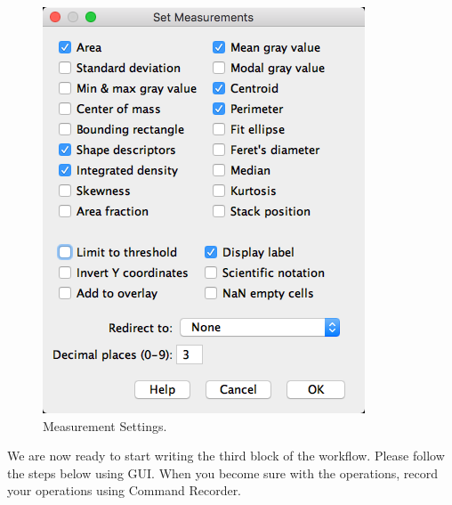 \begin{figure}[h!]
\begin{center}
\includegraphics[scale=0.5]{fig/SetMeasurements.png}
\caption{Measurement Settings.}
\label{fig:MeasSetting}
\end{center}
\end{figure}

We are now ready to start writing the third block of the workflow. Please follow the steps below using GUI. When you become sure with the operations, record your operations using Command Recorder.   

